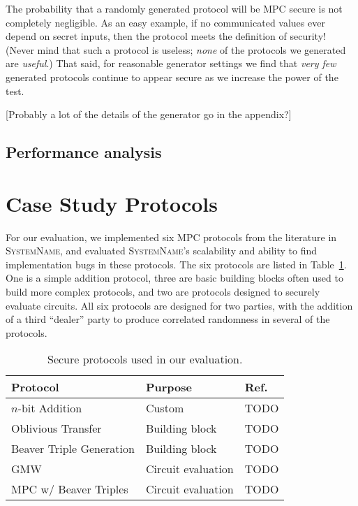 \documentclass[conference]{IEEEtran}
\newcommand{\system}{\textsc{SystemName}\xspace}
\begin{document}
The probability that a randomly generated protocol will be MPC secure is not completely negligible.
As an easy example, if no communicated values ever depend on secret inputs, then the protocol meets the definition of security!
(Never mind that such a protocol is useless; \textit{none} of the protocols we generated are \textit{useful}.)
That said, for reasonable generator settings we find that \textit{very few} generated protocols
continue to appear secure as we increase the power of the test.

[Probably a lot of the details of the generator go in the appendix?]

\subsection{Performance analysis}


\section{Case Study Protocols}
\label{sec:case-study-protocols}

For our evaluation, we implemented six MPC protocols from the literature in \system, and evaluated \system's scalability and ability to find implementation bugs in these protocols. The six protocols are listed in Table~\ref{tbl:protocols}. One is a simple addition protocol, three are basic building blocks often used to build more complex protocols, and two are protocols designed to securely evaluate circuits. All six protocols are designed for two parties, with the addition of a third ``dealer'' party to produce correlated randomness in several of the protocols.

\begin{table}
\centering
  \begin{tabular}{|l | l|l|}
    \hline
    \textbf{Protocol} & \textbf{Purpose} & \textbf{Ref.} \\
    \hline
    $n$-bit Addition & Custom & TODO \\
    Oblivious Transfer & Building block & TODO \\
    Beaver Triple Generation & Building block & TODO \\
    GMW & Circuit evaluation & TODO \\
    MPC w/ Beaver Triples & Circuit evaluation & TODO \\
    \hline
  \end{tabular}
  \caption{Secure protocols used in our evaluation.}
  \label{tbl:protocols}
\end{table}
\end{document}
